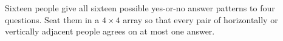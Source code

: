 Sixteen people give all sixteen possible yes-or-no answer patterns to four questions. Seat them in a $4\times4$ array so that every pair of horizontally or vertically adjacent people agrees on at most one answer.
